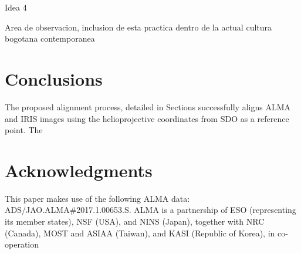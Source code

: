 \documentclass[a4paper,alpha-refs]{eSpectra}
\begin{document}
Idea 4 

Area de observacion, inclusion de esta practica dentro de la actual cultura bogotana contemporanea

\section{Conclusions}
The proposed alignment process, detailed in   Sections
successfully aligns ALMA and IRIS images using the helioprojective coordinates from SDO as a reference point. The 


\section*{Acknowledgments}
This paper makes use of the following ALMA data: ADS/JAO.ALMA\#2017.1.00653.S. ALMA is a partnership of ESO (representing its member states), NSF (USA), and NINS (Japan), together with NRC (Canada), MOST and ASIAA (Taiwan), and KASI (Republic of Korea), in co-operation 





\end{document}
